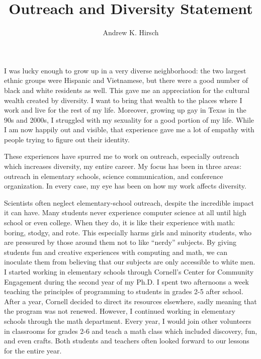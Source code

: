 \documentclass{article}
\author{Andrew K. Hirsch}
\title{Outreach and Diversity Statement}
\date{}
\theoremstyle{definition}
\begin{document}
\maketitle

I was lucky enough to grow up in a very diverse neighborhood: the two largest ethnic groups were Hispanic and Vietnamese, but there were a good number of black and white residents as well.
This gave me an appreciation for the cultural wealth created by diversity.
I want to bring that wealth to the places where I work and live for the rest of my life.
Moreover, growing up gay in Texas in the 90s and 2000s, I struggled with my sexuality for a good portion of my life.
While I am now happily out and visible, that experience gave me a lot of empathy with people trying to figure out their identity.

These experiences have spurred me to work on outreach, especially outreach which increases diversity, my entire career.
My focus has been in three areas: outreach in elementary schools, science communication, and conference organization.
In every case, my eye has been on how my work affects diversity.

Scientists often neglect elementary-school outreach, despite the incredible impact it can have.
Many students never experience computer science at all until high school or even college.
When they do, it is like their experience with math: boring, stodgy, and rote.
This especially harms girls and minority students, who are pressured by those around them not to like ``nerdy'' subjects.
By giving students fun and creative experiences with computing and math, we can inoculate them from believing that our subjects are only accessible to white men.
I started working in elementary schools through Cornell's Center for Community Engagement during the second year of my Ph.D.
I spent two afternoons a week teaching the principles of programming to students in grades 2-5 after school.
After a year, Cornell decided to direct its resources elsewhere, sadly meaning that the program was not renewed.
However, I continued working in elementary schools through the math department.
Every year, I would join other volunteers in classrooms for grades 2-6 and teach a math class which included discovery, fun, and even crafts.
Both students and teachers often looked forward to our lessons for the entire year.
\end{document}
